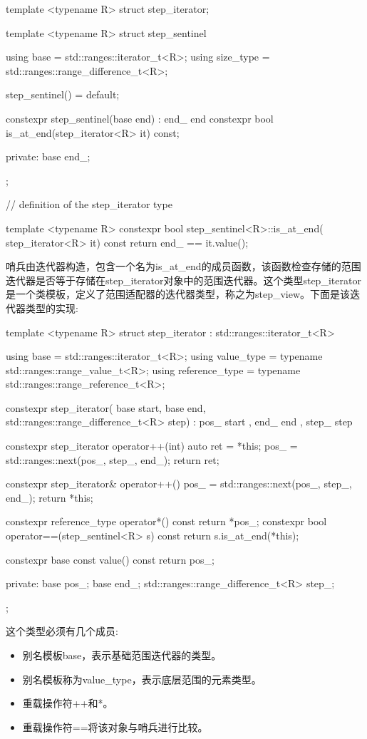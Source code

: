 \begin{cpp}
template <typename R>
struct step_iterator;

template <typename R>
struct step_sentinel
{
	using base = std::ranges::iterator_t<R>;
	using size_type = std::ranges::range_difference_t<R>;
	
	step_sentinel() = default;
	
	constexpr step_sentinel(base end) : end_{ end } {}
	constexpr bool is_at_end(step_iterator<R> it) const;
	
private:
	base end_;
};

// definition of the step_iterator type

template <typename R>
constexpr bool step_sentinel<R>::is_at_end(
	step_iterator<R> it) const
{
	return end_ == it.value();
}
\end{cpp}

哨兵由迭代器构造，包含一个名为is\_at\_end的成员函数，该函数检查存储的范围迭代器是否等于存储在step\_iterator对象中的范围迭代器。这个类型step\_iterator是一个类模板，定义了范围适配器的迭代器类型，称之为step\_view。下面是该迭代器类型的实现:

\begin{cpp}
template <typename R>
struct step_iterator : std::ranges::iterator_t<R>
{
	using base
		= std::ranges::iterator_t<R>;
	using value_type
		= typename std::ranges::range_value_t<R>;
	using reference_type
		= typename std::ranges::range_reference_t<R>;
		
	constexpr step_iterator(
		base start, base end,
		std::ranges::range_difference_t<R> step) :
		pos_{ start }, end_{ end }, step_{ step }
	{
	}

	constexpr step_iterator operator++(int)
	{
		auto ret = *this;
		pos_ = std::ranges::next(pos_, step_, end_);
		return ret;
	}

	constexpr step_iterator& operator++()
	{
		pos_ = std::ranges::next(pos_, step_, end_);
		return *this;
	}

	constexpr reference_type operator*() const
	{
		return *pos_;
	}
	constexpr bool operator==(step_sentinel<R> s) const
	{
		return s.is_at_end(*this);
	}

	constexpr base const value() const { return pos_; }
	
private:
	base pos_;
	base end_;
	std::ranges::range_difference_t<R> step_;
};
\end{cpp}

这个类型必须有几个成员:

\begin{itemize}
\item
别名模板base，表示基础范围迭代器的类型。

\item
别名模板称为value\_type，表示底层范围的元素类型。

\item
重载操作符++和*。

\item
重载操作符==将该对象与哨兵进行比较。
\end{itemize}

